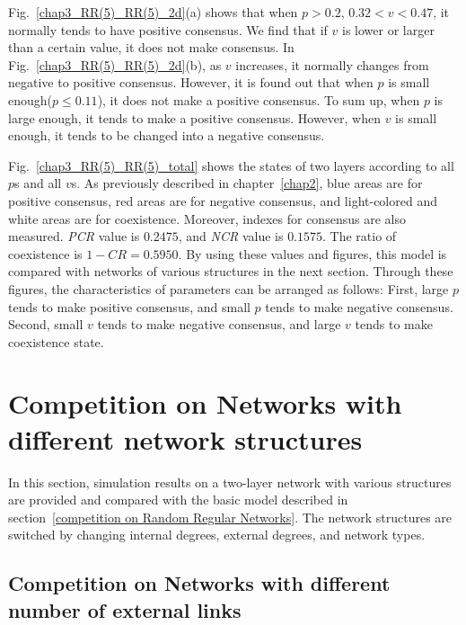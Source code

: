 Fig.~\ref{chap3_RR(5)_RR(5)_2d}(a) shows that when $p > 0.2$, $0.32 < v < 0.47$, it normally tends to have positive consensus. We find that if $v$ is lower or larger than a certain value, it does not make consensus. In Fig.~\ref{chap3_RR(5)_RR(5)_2d}(b), as $v$ increases, it normally changes from negative to positive consensus. However, it is found out that when $p$ is small enough($p \le 0.11$), it does not make a positive consensus.  To sum up, when $p$ is large enough, it tends to make a positive consensus. However, when $v$ is small enough, it tends to be changed into a negative consensus.

Fig.~\ref{chap3_RR(5)_RR(5)_total} shows the states of two layers according to all $p$s and all $v$s. As previously described in chapter~\ref{chap2}, blue areas are for positive consensus, red areas are for negative consensus, and light-colored and white areas are for coexistence. Moreover, indexes for consensus are also measured. \textit{PCR} value is $0.2475$, and \textit{NCR} value is $0.1575$. The ratio of coexistence is $1 - CR = 0.5950$. By using these values and figures, this model is compared with networks of various structures in the next section. Through these figures, the characteristics of parameters can be arranged as follows: First, large $p$ tends to make positive consensus, and small $p$ tends to make negative consensus. Second, small $v$ tends to make negative consensus, and large $v$ tends to make coexistence state. \\


\section{Competition on Networks with different network structures}
In this section, simulation results on a two-layer network with various structures are provided and compared with the basic model described in section~\ref{competition on Random Regular Networks}.
The network structures are switched by changing internal degrees, external degrees, and network types. \\

\subsection{Competition on Networks with different number of external links}

